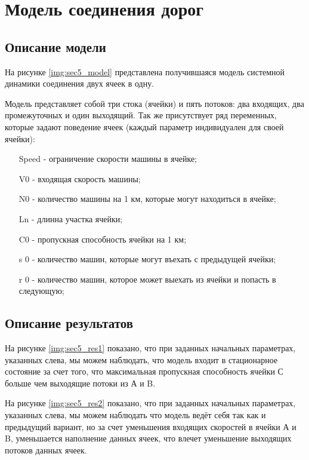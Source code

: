\section{Модель соединения дорог}

\subsection{Описание модели}

На рисунке \ref{img:sec5_model} представлена получившаяся модель системной динамики соединения двух ячеек в одну.

Модель представляет собой три стока (ячейки) и пять потоков: два входящих, два промежуточных и один выходящий.
Так же присутствует ряд переменных, которые задают поведение ячеек (каждый параметр индивидуален для своей ячейки):
\begin{itemize}
    \item[Speed] - ограничение скорости машины в ячейке;
    \item[V0] - входящая скорость машины;
    \item[N0] - количество машины на 1 км, которые могут находиться в ячейке;
    \item[Ln] - длинна участка ячейки;
    \item[C0] - пропускная способность ячейки на 1 км;
    \item[s 0] - количество машин, которые могут въехать с предыдущей ячейки;
    \item[r 0] - количество машин, которое может выехать из ячейки и попасть в следующую;
\end{itemize}


\subsection{Описание результатов}

На рисунке \ref{img:sec5_res1} показано, что при заданных начальных параметрах, указанных слева, мы можем наблюдать, что модель входит в стационарное состояние за счет того, что максимальная пропускная способность ячейки С больше чем выходящие потоки из А и B.


На рисунке \ref{img:sec5_res2} показано, что при заданных начальных параметрах, указанных слева, мы можем наблюдать что модель ведёт себя так как и предыдущий вариант, но за счет уменьшения входящих скоростей в ячейки А и B, уменьшается наполнение данных ячеек, что влечет уменьшение выходящих потоков данных ячеек. 

